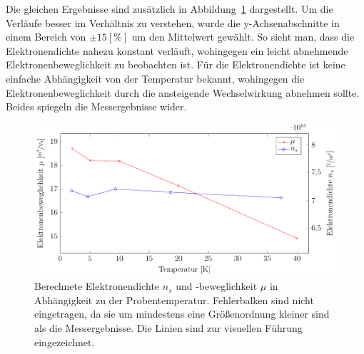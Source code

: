 Die gleichen Ergebnisse sind zusätzlich in Abbildung~\ref{fig:temp_ausw} dargestellt. Um die Verläufe besser im Verhältnis zu verstehen, wurde die y-Achsenabschnitte in einem Bereich von $\pm \unit{15}[\%] $ um den Mittelwert gewählt. So sieht man, dass die Elektronendichte nahezu konstant verläuft, wohingegen ein leicht abnehmende Elektronenbeweglichkeit zu beobachten ist. Für die Elektronendichte ist keine einfache Abhängigkeit von der Temperatur bekannt, wohingegen die Elektronenbeweglichkeit durch die ansteigende Wechselwirkung abnehmen sollte. Beides spiegeln die Messergebnisse wider.

\begin{figure}[h]
	\centering
	\includegraphics[scale=1]{graphs/temperatur/auswertung.pdf}
	\caption[Auswertung der Temperaturvariation]{
		Berechnete Elektronendichte $n_s$ und -beweglichkeit $\mu$ in Abhängigkeit zu der Probentemperatur. Fehlerbalken sind nicht eingetragen, da sie um mindestens eine Größenordnung kleiner sind als die Messergebnisse. Die Linien sind zur visuellen Führung eingezeichnet.
	}
	\label{fig:temp_ausw}
\end{figure}

